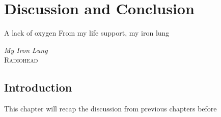\chapter{Discussion and Conclusion} \label{sec:discussion_and_conclusion}
    \vspace*{\fill}
    \setlength{\epigraphwidth}{0.4\linewidth}
    \renewcommand{\epigraphflush}{flushright}
    \renewcommand{\epigraphsize}{\footnotesize}
    \epigraph{A lack of oxygen\newline
              From my life support, my iron lung}%
              {\textit{My Iron Lung}\\ \textsc{Radiohead}}
    
    \newpage
    
    \section{Introduction} \label{sec:discussion_and_conclusion_introduction}
        This chapter will recap the discussion from previous chapters before 
